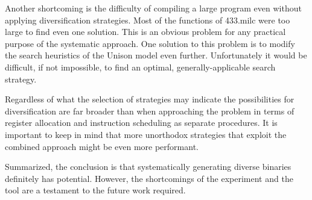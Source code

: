 Another shortcoming is the difficulty of compiling a large program even without applying
diversification strategies. Most of the functions of 433.milc were too large to find even
one solution. This is an obvious problem for any practical purpose of the systematic
approach. One solution to this problem is to modify the search heuristics of the Unison
model even further. Unfortunately it would be difficult, if not impossible, to find an
optimal, generally-applicable search strategy.

Regardless of what the selection of strategies may indicate the possibilities for
diversification are far broader than when approaching the problem in terms of register
allocation and instruction scheduling as separate procedures. It is important to keep in
mind that more unorthodox strategies that exploit the combined approach might be even
more performant.

Summarized, the conclusion is that systematically generating diverse binaries definitely
has potential. However, the shortcomings of the experiment and the tool are a testament to
the future work required.
